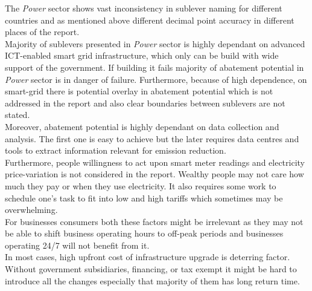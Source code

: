 \documentclass[11pt, twocolumn]{article}
\begin{document}
The \emph{Power} sector shows vast inconsistency in sublever naming for different countries and as mentioned above different decimal point accuracy in different places of the report.\\
Majority of sublevers presented in \emph{Power} sector is highly dependant on advanced ICT-enabled smart grid infrastructure, which only can be build with wide support of the government. If building it fails majority of abatement potential in \emph{Power} sector is in danger of failure. Furthermore, because of high dependence, on smart-grid there is potential overlay in abatement potential which is not addressed in the report and also clear boundaries between sublevers are not stated.\\
Moreover, abatement potential is highly dependant on data collection and analysis. The first one is easy to achieve but the later requires data centres and tools to extract information relevant for emission reduction.\\
Furthermore, people willingness to act upon smart meter readings and electricity price-variation is not considered in the report. Wealthy people may not care how much they pay or when they use electricity. It also requires some work to schedule one's task to fit into low and high tariffs which sometimes may be overwhelming.\\
For businesses consumers both these factors might be irrelevant as they may not be able to shift business operating hours to off-peak periods and businesses operating 24/7 will not benefit from it.\\

In most cases, high upfront cost of infrastructure upgrade is deterring factor. Without government subsidiaries, financing, or tax exempt it might be hard to introduce all the changes especially that majority of them has long return time.

{}

\end{document}
